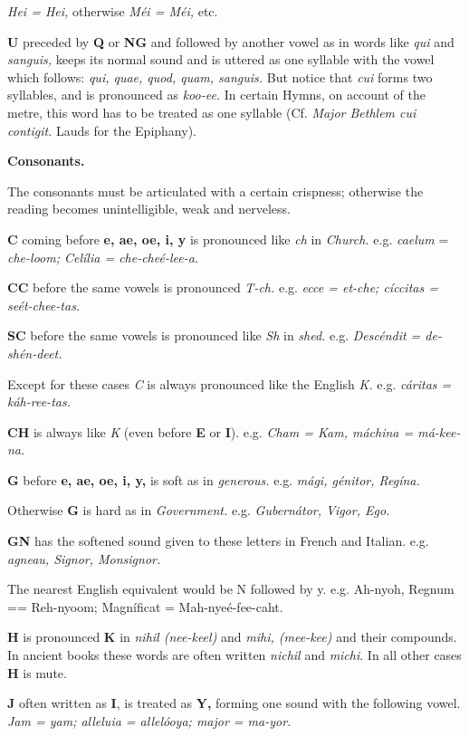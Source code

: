 {{{{{\it Hei = Hei,} otherwise {\it Méi = Méi,} etc.

{\bf U} preceded by {\bf Q} or {\bf NG} and followed by another vowel as in words like {\it qui} and {\it sanguis,} keeps its normal sound and is uttered as one syllable with the vowel which follows: {\it qui, quae, quod, quam, sanguis.} But notice that {\it cui} forms two syllables, and is pronounced as {\it koo-ee.} In certain Hymns, on account of the metre, this word has to be treated as one syllable (Cf. {\it Major Bethlem cui contigit.} Lauds for the Epiphany).

{\bf Consonants.}

The consonants must be articulated with a certain crispness; otherwise the reading becomes unintelligible, weak and nerveless.

{\bf C} coming before {\bf e, ae, oe, i, y} is pronounced like {\it ch} in {\it Church.}
e.g. {\it caelum} = {\it che-loom; Celília = che-cheé-lee-a.}

{\bf CC} before the same vowels is pronounced {\it T-ch.}
e.g. {\it ecce = et-che; cíccitas = seét-chee-tas.}

{\bf SC} before the same vowels is pronounced like {\it Sh} in {\it shed.}
e.g. {\it Descéndit = de-shén-deet.}

Except for these cases {\it C} is always pronounced like the English {\it K.}
e.g. {\it cáritas = káh-ree-tas.}

{\bf CH} is always like {\it K} (even before {\bf E} or {\bf I}).
e.g. {\it Cham = Kam, máchina = má-kee-na.}

{\bf G} before {\bf e, ae, oe, i, y,} is soft as in {\it generous.}
e.g. {\it mági, génitor, Regína.}

Otherwise {\bf G} is hard as in {\it Government.}
e.g. {\it Gubernátor, Vigor, Ego.}

{\bf GN} has the softened sound given to these letters in French and Italian.
e.g. {\it agneau, Signor, Monsignor.}

The nearest English equivalent would be N followed by y.
e.g. Ah-nyoh, Regnum == Reh-nyoom; Magníficat = Mah-nyeé-fee-caht.

{\bf H} is pronounced {\bf K} in {\it nihil (nee-keel)} and {\it mihi, (mee-kee)} and their compounds. In ancient books these words are often written {\it nichil} and {\it michi}. In all other cases {\bf H} is mute.

{\bf J} often written as {\bf I}, is treated as {\bf Y,} forming one sound with the following vowel.
{\it Jam = yam; alleluia = allelóoya; major = ma-yor.}

}}}}
